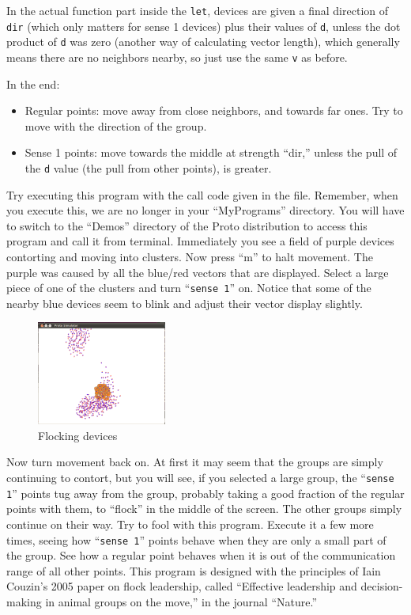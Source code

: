 \documentclass{article}
\newcommand\var[1]{{\tt #1}}
\newcommand\qvar[1]{``{\tt #1}''}
\begin{document}
In the actual function part inside the \var{let}, devices are given a
final direction of \var{dir} (which only matters for sense 1 devices)
plus their values of \var{d}, unless the dot product of \var{d} was
zero (another way of calculating vector length), which generally means
there are no neighbors nearby, so just use the same \var{v} as before.

In the end:
\begin{itemize}
\item Regular points: move away from close neighbors, and towards far
  ones.  Try to move with the direction of the group.
\item Sense 1 points: move towards the middle at strength ``dir,''
  unless the pull of the \var{d} value (the pull from other points),
  is greater.
\end{itemize}

Try executing this program with the call code given in the file.
Remember, when you execute this, we are no longer in your
``MyPrograms'' directory.  You will have to switch to the ``Demos''
directory of the Proto distribution to access this program and call it
from terminal.  Immediately you see a field of purple devices
contorting and moving into clusters.  Now press ``m'' to halt
movement.  The purple was caused by all the blue/red vectors that are
displayed.  Select a large piece of one of the clusters and turn
\qvar{sense 1} on.  Notice that some of the nearby blue devices seem
to blink and adjust their vector display slightly.

\begin{figure}
  \includegraphics[width=0.38\textwidth]{figures/flock.png}
  \caption{Flocking devices}
  \label{f:flock}
\end{figure}

Now turn movement back on.  At first it may seem that the groups are
simply continuing to contort, but you will see, if you selected a
large group, the \qvar{sense 1} points tug away from the group,
probably taking a good fraction of the regular points with them, to
``flock'' in the middle of the screen.  The other groups simply
continue on their way.  Try to fool with this program.  Execute it a
few more times, seeing how \qvar{sense 1} points behave when they are
only a small part of the group.  See how a regular point behaves when
it is out of the communication range of all other points.  This
program is designed with the principles of Iain Couzin's 2005 paper on
flock leadership, called ``Effective leadership and decision-making in
animal groups on the move,'' in the journal ``Nature.''
\end{document}
